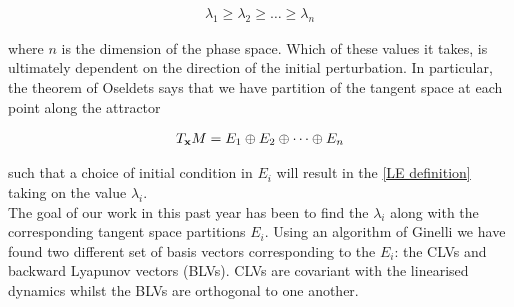 \begin{align}
    \lambda_1 \geq \lambda_2 \geq \dots \geq \lambda_n \label{LE list}
\end{align}

where $n$ is the dimension of the phase space. Which of these values it takes, is ultimately dependent on the direction of the initial perturbation. In particular, the theorem of Oseldets says that we have partition of the tangent space at each point along the attractor

\begin{align}
T_{\vb{x}} M = E_1 \oplus E_2 \oplus \dots \oplus E_n \label{Ruelle Split}
\end{align}

such that a choice of initial condition in $E_i$ will result in the \ref{LE definition} taking on the value $\lambda_i$.\\

The goal of our work in this past year has been to find the $\lambda_i$ along with the corresponding tangent space partitions $E_i$. Using an algorithm of Ginelli \cite{Ginelli2013} we have found two different set of basis vectors corresponding to the $E_i$: the CLVs and backward Lyapunov vectors (BLVs). CLVs are covariant with the linearised dynamics whilst the BLVs are orthogonal to one another.
